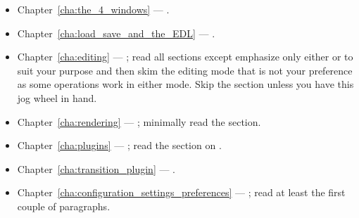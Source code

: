 \begin{itemize}
    \item Chapter~\ref{cha:the_4_windows} --- .
    \item Chapter~\ref{cha:load_save_and_the_EDL} --- .
    \item Chapter~\ref{cha:editing} --- ; read all sections except emphasize only either  or  to suit your purpose and then skim the editing mode that is not your preference as some operations work in either mode.
        Skip the  section unless you have this jog wheel in hand.
    \item Chapter~\ref{cha:rendering} --- ; minimally read the  section.
    \item Chapter~\ref{cha:plugins} --- ; read the section on .
    \item Chapter~\ref{cha:transition_plugin} --- .
    \item Chapter~\ref{cha:configuration_settings_preferences} --- ; read at least the first couple of paragraphs.
\end{itemize}

